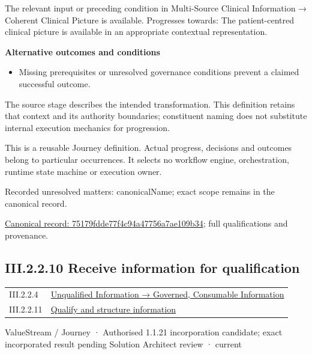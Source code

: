 The relevant input or preceding condition in Multi-Source Clinical Information → Coherent Clinical Picture is available. Progresses towards: The patient-centred clinical picture is available in an appropriate contextual representation.



\par\medskip\textbf{Alternative outcomes and conditions}\par


\begin{itemize}


\item Missing prerequisites or unresolved governance conditions prevent a claimed successful outcome.

\end{itemize}


The source stage describes the intended transformation. This definition retains that context and its authority boundaries; constituent naming does not substitute internal execution mechanics for progression.



This is a reusable Journey definition. Actual progress, decisions and outcomes belong to particular occurrences. It selects no workflow engine, orchestration, runtime state machine or execution owner.


{\small Recorded unresolved matters: canonicalName; exact scope remains in the canonical record.}\par
{\footnotesize \href{../../../../../../../continuum/strategy/value-stream/75179fdde77f4c94a47756a7ae109b34.md}{Canonical record: 75179fdde77f4c94a47756a7ae109b34}; full qualifications and provenance.}\par
\subsection*{III.2.2.10 Receive information for qualification}
\label{navigation:III.2.2.10}

\begin{longtable}{p{.22\linewidth}p{.73\linewidth}}
III.2.2.4 & \hyperref[element:02e036f18bab400bac261007e39457ee]{Unqualified Information → Governed, Consumable Information} \\
III.2.2.11 & \hyperref[element:cbedc98406674727a9b1eae8d9bc30da]{Qualify and structure information} \\
\end{longtable}
\label{element:28544771580448638e209bb377a25fbe}
{\small ValueStream / Journey · Authorised 1.1.21 incorporation candidate; exact incorporated result pending Solution Architect review · current}\par

